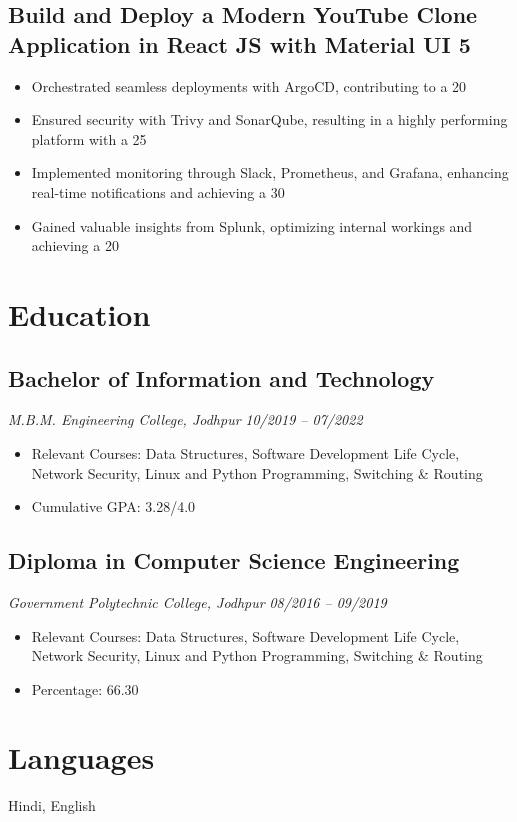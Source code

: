 \documentclass[a4paper,10pt]{article}
\begin{document}
\subsection*{Build and Deploy a Modern YouTube Clone Application in React JS with Material UI 5}
\begin{itemize}
    \item Orchestrated seamless deployments with ArgoCD, contributing to a 20%
    \item Ensured security with Trivy and SonarQube, resulting in a highly performing platform with a 25%
    \item Implemented monitoring through Slack, Prometheus, and Grafana, enhancing real-time notifications and achieving a 30%
    \item Gained valuable insights from Splunk, optimizing internal workings and achieving a 20%
\end{itemize}


\section*{Education}

\subsection*{Bachelor of Information and Technology}
\textit{M.B.M. Engineering College, Jodhpur} \hfill \textit{10/2019 – 07/2022}
\begin{itemize}
    \item Relevant Courses: Data Structures, Software Development Life Cycle, Network Security, Linux and Python Programming, Switching \& Routing
    \item Cumulative GPA: 3.28/4.0
\end{itemize}

\subsection*{Diploma in Computer Science Engineering}
\textit{Government Polytechnic College, Jodhpur} \hfill \textit{08/2016 – 09/2019}
\begin{itemize}
    \item Relevant Courses: Data Structures, Software Development Life Cycle, Network Security, Linux and Python Programming, Switching \& Routing
    \item Percentage: 66.30%
\end{itemize}

\section*{Languages}
Hindi, English
\end{document}

